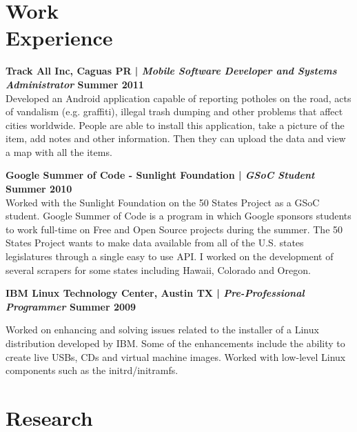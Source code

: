 \documentclass[margin,line]{res}
\begin{document}
\begin{resume}
\section{\sc Work \\Experience}

{\bf Track All Inc, Caguas PR | {\em Mobile Software Developer and Systems Administrator} \hfill {\bf Summer 2011 \\} }
\vspace{-.01cm}
Developed an Android application capable of reporting potholes on the road, acts of vandalism (e.g. graffiti), illegal trash dumping and other problems that affect cities worldwide. People are able to install this application, take a picture of the item, add notes and other information. Then they can upload the data and view a map with all the items.

{\bf Google Summer of Code - Sunlight Foundation | {\em GSoC Student} \hfill {\bf Summer 2010 \\} }
\vspace{-.01cm}
Worked with the Sunlight Foundation on the 50 States Project as a GSoC student. Google Summer of Code is a program in which Google sponsors students to work full-time on Free and Open Source projects during the summer. The 50 States Project wants to make data available from all of the U.S. states legislatures through a single easy to use API. I worked on the development of several scrapers for some states including Hawaii, Colorado and Oregon.


{\bf IBM Linux Technology Center, Austin TX | {\em Pre-Professional Programmer} \hfill {\bf Summer 2009 \\} }
\vspace{-.01cm}

Worked on enhancing and solving issues related to the installer of a Linux distribution developed by IBM. Some of the enhancements include the ability to create live USBs, CDs and virtual machine images. Worked with low-level Linux components such as the initrd/initramfs.

\section{\sc Research}


\end{resume}
\end{document}
